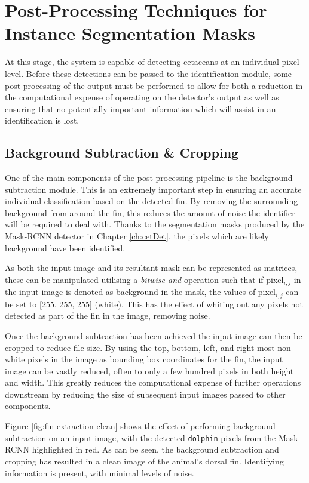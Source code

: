\chapter{Post-Processing Techniques for Instance Segmentation Masks}\label{ch:postProcessing}

At this stage, the system is capable of detecting cetaceans at an individual pixel level. Before these detections can be passed to the identification module, some post-processing of the output must be performed to allow for both a reduction in the computational expense of operating on the detector's output as well as ensuring that no potentially important information which will assist in an identification is lost. 


\section{Background Subtraction \& Cropping}\label{ch:postProcessing,sec:bgExtraction}

One of the main components of the post-processing pipeline is the background subtraction module. This is an extremely important step in ensuring an accurate individual classification based on the detected fin. By removing the surrounding background from around the fin, this reduces the amount of noise the identifier will be required to deal with. Thanks to the segmentation masks produced by the Mask-RCNN detector \cite{he_mask_2017} in Chapter \ref{ch:cetDet}, the pixels which are likely background have been identified.

As both the input image and its resultant mask can be represented as matrices, these can be manipulated utilising a \textit{bitwise and} operation such that if pixel$_{i, j}$ in the input image is denoted as background in the mask, the values of pixel$_{i, j}$ can be set to [255, 255, 255] (white). This has the effect of whiting out any pixels not detected as part of the fin in the image, removing noise. 

Once the background subtraction has been achieved the input image can then be cropped to reduce file size. By using the top, bottom, left, and right-most non-white pixels in the image as bounding box coordinates for the fin, the input image can be vastly reduced, often to only a few hundred pixels in both height and width. This greatly reduces the computational expense of further operations downstream by reducing the size of subsequent input images passed to other components. 

Figure \ref{fig:fin-extraction-clean} shows the effect of performing background subtraction on an input image, with the detected \texttt{dolphin} pixels from the Mask-RCNN highlighted in red. As can be seen, the background subtraction and cropping has resulted in a clean image of the animal's dorsal fin. Identifying information is present, with minimal levels of noise. 

